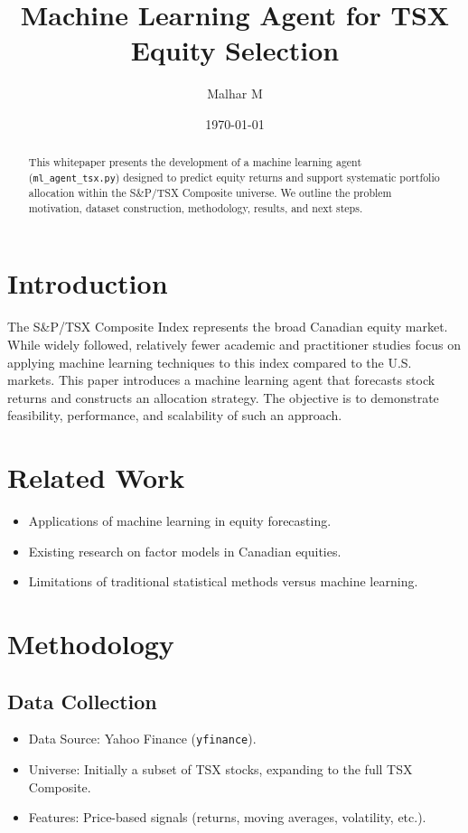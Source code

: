 \documentclass[11pt]{article}
\title{\textbf{Machine Learning Agent for TSX Equity Selection}}
\author{Malhar M}
\date{\today}
\begin{document}
\maketitle

\begin{abstract}
This whitepaper presents the development of a machine learning agent (\texttt{ml\_agent\_tsx.py}) designed to predict equity returns and support systematic portfolio allocation within the S\&P/TSX Composite universe. We outline the problem motivation, dataset construction, methodology, results, and next steps.
\end{abstract}

\tableofcontents
\newpage

\section{Introduction}
The S\&P/TSX Composite Index represents the broad Canadian equity market. While widely followed, relatively fewer academic and practitioner studies focus on applying machine learning techniques to this index compared to the U.S. markets. This paper introduces a machine learning agent that forecasts stock returns and constructs an allocation strategy. The objective is to demonstrate feasibility, performance, and scalability of such an approach.

\section{Related Work}
\begin{itemize}
    \item Applications of machine learning in equity forecasting.
    \item Existing research on factor models in Canadian equities.
    \item Limitations of traditional statistical methods versus machine learning.
\end{itemize}

\section{Methodology}
\subsection{Data Collection}
\begin{itemize}
    \item Data Source: Yahoo Finance (\texttt{yfinance}).
    \item Universe: Initially a subset of TSX stocks, expanding to the full TSX Composite.
    \item Features: Price-based signals (returns, moving averages, volatility, etc.).
\end{itemize}
\end{document}
